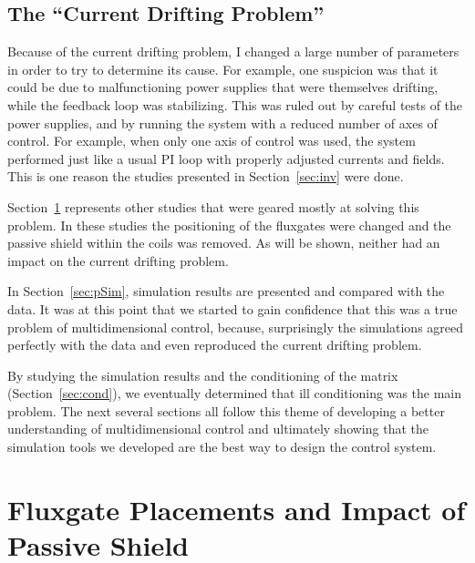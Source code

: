 \subsection{The ``Current Drifting Problem''}

Because of the current drifting problem, I changed a large number of
parameters in order to try to determine its cause.  For example, one
suspicion was that it could be due to malfunctioning power supplies
that were themselves drifting, while the feedback loop was
stabilizing.  This was ruled out by careful tests of the power
supplies, and by running the system with a reduced number of axes of
control.  For example, when only one axis of control was used, the
system performed just like a usual PI loop with properly adjusted
currents and fields.  This is one reason the studies presented in
Section~\ref{sec:inv} were done.

Section~\ref{sec:flux_place} represents other studies that were geared
mostly at solving this problem.  In these studies the positioning of
the fluxgates were changed and the passive shield within the coils was
removed.  As will be shown, neither had an impact on the current
drifting problem.

In Section~\ref{sec:pSim}, simulation results are presented and
compared with the data.  It was at this point that we started to gain
confidence that this was a true problem of multidimensional control,
because, surprisingly the simulations agreed perfectly with
the data and even reproduced the current drifting problem.

By studying the simulation results and the conditioning of the
matrix (Section~\ref{sec:cond}), we eventually determined that
ill conditioning was the main problem.  The next several sections all
follow this theme of developing a better understanding of
multidimensional control and ultimately showing that the simulation tools
we developed are the best way to design the control system.


\section{Fluxgate Placements and Impact of Passive Shield}\label{sec:flux_place}


